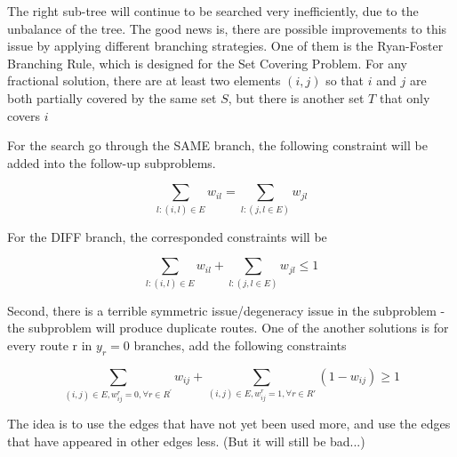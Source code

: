         The right sub-tree will continue to be searched very inefficiently, due to the unbalance of the tree. The good news is, there are possible improvements to this issue by applying different branching strategies. One of them is the Ryan-Foster Branching Rule, which is designed for the Set Covering Problem. For any fractional solution, there are at least two elements $(i,j)$ so that $i$ and $j$ are both partially covered by the same set $S$, but there is another set $T$ that only covers $i$
        \begin{figure}[h!]
            \centering
        \end{figure}

        For the search go through the SAME branch, the following constraint will be added into the follow-up subproblems.

        \begin{equation*}
            \sum_{l: (i, l) \in E} w_{il} = \sum_{l: (j, l \in E)} w_{jl}
        \end{equation*}

        For the DIFF branch, the corresponded constraints will be

        \begin{equation*}
            \sum_{l: (i, l) \in E} w_{il} + \sum_{l: (j, l \in E)} w_{jl} \le 1
        \end{equation*}

        Second, there is a terrible symmetric issue/degeneracy issue in the subproblem - the subproblem will produce duplicate routes. One of the another solutions is for every route r in $y_r = 0$ branches, add the following constraints

        \begin{equation*}
            \sum_{(i, j) \in E, w_{ij}^r = 0, \forall r \in R^\prime} w_{ij} + \sum_{(i, j) \in E, w_{ij}^r = 1, \forall r \in R'} (1 - w_{ij}) \ge 1
        \end{equation*}

        The idea is to use the edges that have not yet been used more, and use the edges that have appeared in other edges less. (But it will still be bad...)
    

